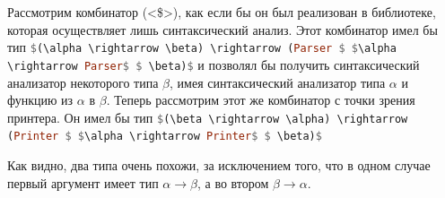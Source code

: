 \documentclass{matmex-diploma-custom}
\begin{document}
Рассмотрим комбинатор (<\$>), как если бы он был реализован в библиотеке, которая осуществляет лишь синтаксический анализ. Этот комбинатор имел бы тип
\lstinline[language=haskell,mathescape]{$(\alpha \rightarrow \beta) \rightarrow (Parser $ $\alpha \rightarrow Parser$ $ \beta)$}
и позволял бы получить синтаксический анализатор некоторого типа $\beta$, имея синтаксический анализатор типа $\alpha$ и функцию из $\alpha$ в $\beta$. Теперь рассмотрим этот же комбинатор с точки зрения принтера. Он имел бы тип \lstinline[language=haskell,mathescape]{$(\beta \rightarrow \alpha) \rightarrow (Printer $ $\alpha \rightarrow Printer$ $ \beta)$}


Как видно, два типа очень похожи, за исключением того, что в одном случае первый аргумент имеет тип $\alpha \rightarrow \beta$, а во втором $\beta \rightarrow \alpha$.




\end{document}
